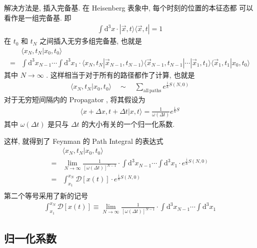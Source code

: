 \documentclass[11pt]{article}
\begin{document}
解决方法是, 插入完备基. 在 Heisenberg 表象中, 每个时刻的位置的本征态都
可以看作是一组完备基. 即
\begin{align}
  \int \mathrm{d}^3 x\cdot |\vec{x},t\rangle \langle \vec{x},t |
  = 1
\end{align}
在 \(t_0\) 和 \(t_N\) 之间插入无穷多组完备基, 也就是
\begin{align*}
  &\langle x_N, t_N | x_0 , t_0 \rangle \\
   =&
   \int\mathrm{d}^3 x_{N-1}\cdots
   \int\mathrm{d}^3 x_1 \cdot
   \langle x_N, t_N |\vec{x}_{N-1},t_{N-1}\rangle
   \langle \vec{x}_{N-1},t_{N-1} |
   \cdots |\vec{x}_1, t_1\rangle
   \langle \vec{x}_1, t_1 | x_0 , t_0 \rangle
\end{align*}
其中 \(N\to \infty\) . 这样相当于对于所有的路径都作了计算, 也就是
\begin{align}
      \langle x_N, t_N | x_0 , t_0 \rangle \quad \sim
  \quad \sum_{\mathrm{all\,paths}} e^{\frac{\mathrm{i}}{\hbar}S(N,0)}
\end{align}
对于无穷短间隔内的 Propagator , 将其假设为
\begin{align}
  \langle x +\Delta x , t + \Delta t |x , t \rangle
  = \frac{1}{\omega(\Delta t)}
   e^{\frac{\mathrm{i}}{\hbar}S}
\end{align}
其中 \(\omega(\Delta t)\) 是只与 \(\Delta t\) 的大小有关的一个归一化系数.

这样, 就得到了 Feynman 的 Path Integral 的表达式
\begin{align*}
  &\langle x_N, t_N | x_0 , t_0 \rangle \\
  =& \lim_{N\to \infty}\frac{1}{[\omega(\Delta t)]^{N-1}}\cdot
   \int\mathrm{d}^3 x_{N-1}\cdots
   \int\mathrm{d}^3 x_1 \cdot e^{\frac{\mathrm{i}}{\hbar}S(N,0)}\\
  =&\int_{x_1}^{x_N}\mathcal{D}[x(t)] \cdot e^{\frac{\mathrm{i}}{\hbar}S(N,0)}\\
\end{align*}
第二个等号采用了新的记号
\begin{align}
  \int_{x_1}^{x_N} \mathcal{D}[x(t)]\equiv \lim_{N\to \infty}\frac{1}{[\omega(\Delta t)]^{N-1}}\cdot
   \int\mathrm{d}^3 x_{N-1}\cdots
   \int\mathrm{d}^3 x_1 
\end{align}

\subsection{归一化系数}
\label{sec:orgf49edaa}
\end{document}
